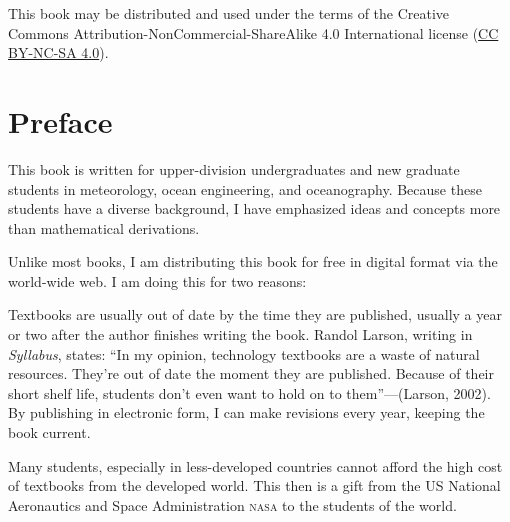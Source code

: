 
\vspace*{\fill}
\noindent{}This book may be distributed and used under the terms of the
Creative Commons Attribution-NonCommercial-ShareAlike 4.0 International
license (\href{https://creativecommons.org/licenses/by-nc-sa/4.0/legalcode}{CC BY-NC-SA 4.0}).
\tableofcontents

\chapter{Preface}
This book is written for upper-division undergraduates and new
graduate students in meteorology, ocean engineering, and
oceanography. Because these students have a diverse background, I have
emphasized ideas and concepts more than mathematical derivations.

Unlike most books, I am distributing this book for free in digital
format via the world-wide web. I am doing this for two reasons:
\begin{enumerate}
\vitem Textbooks are usually out of date by the time they are
published, usually a year or two after the author finishes writing the
book. Randol Larson, writing in \textit{Syllabus}, states: ``In my
opinion, technology textbooks are a waste of natural
resources. They're out of date the moment they are published. Because
of their short shelf life, students don't even want to hold on to
them''---(Larson, 2002). By publishing in electronic form, I can make
revisions every year, keeping the book current.

\vitem Many students, especially in less-developed countries cannot
afford the high cost of textbooks from the developed world. This then
is a gift from the US National Aeronautics and Space Administration
\textsc{nasa} to the students of the world.
\end{enumerate} 

